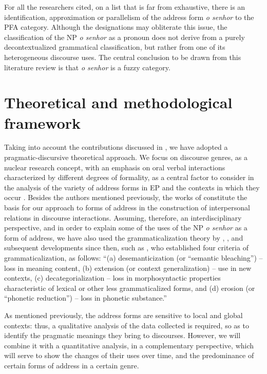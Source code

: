 \documentclass[output=paper]{langscibook}
\begin{document}
For all the researchers cited, on a list that is far from exhaustive, there is an identification, approximation or parallelism of the address form \textit{o senhor} to the PFA category. Although the designations may obliterate this issue, the classification of the NP \textit{o senhor} as a pronoun does not derive from a purely decontextualized grammatical classification, but rather from one of its heterogeneous discourse uses. The central conclusion to be drawn from this literature review is that \textit{o senhor} is a fuzzy category.


\section{Theoretical and methodological framework}\label{sec:marques:3}

Taking into account the contributions discussed in , we have adopted a prag\-mat\-ic-dis\-cur\-sive theoretical approach. We focus on discourse genres, as a nuclear research concept, with an emphasis on oral verbal interactions characterized by different degrees of formality, as a central factor to consider in the analysis of the variety of address forms in EP and the contexts in which they occur \citep{Marques2014}. Besides the authors mentioned previously, the works of \citet{Kerbrat-Orecchioni1992,Kerbrat-Orecchioni2005} constitute the basis for our approach to forms of address in the construction of interpersonal relations in discourse interactions. Assuming, therefore, an interdisciplinary perspective, and in order to explain some of the uses of the NP \textit{o senhor} as a form of address, we have also used the grammaticalization theory by \citet{TraugottHeine1991}, \citet{Lehmann2015}, and subsequent developments since then, such as \citet[17]{HeineKuteva2004}, who established four criteria of grammaticalization, as follows: “(a) desemanticization (or “semantic bleaching”) – loss in meaning content, (b) extension (or context generalization) – use in new contexts, (c) decategorialization – loss in morphosyntactic properties characteristic of lexical or other less grammaticalized forms, and (d) erosion (or “phonetic reduction”) – loss in phonetic substance.” 



As mentioned previously, the address forms are sensitive to local and global contexts: thus, a qualitative analysis of the data collected is required, so as to identify the pragmatic meanings they bring to discourses. However, we will combine it with a quantitative analysis, in a complementary perspective, which will serve to show the changes of their uses over time, and the predominance of certain forms of address in a certain genre.
\end{document}
